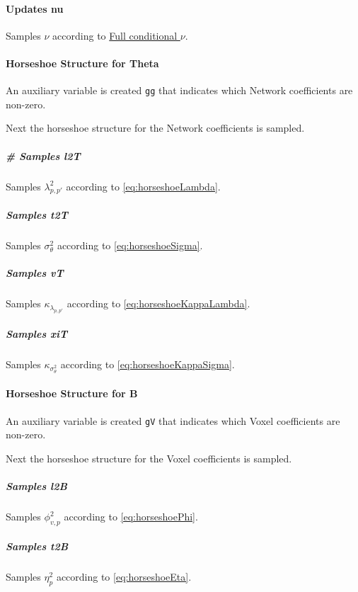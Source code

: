 \documentclass[
]{article}
\begin{document}
\paragraph{Updates nu}\label{updates-nu}

Samples \(\nu\) according to \hyperref[full-conditional-nu]{Full conditional \(\nu\)}.

\paragraph{Horseshoe Structure for Theta}\label{horseshoe-structure-for-theta}

An auxiliary variable is created \texttt{gg} that indicates which Network coefficients
are non-zero.

Next the horseshoe structure for the Network coefficients is sampled.

\subparagraph{\# Samples l2T}\label{samples-l2t}

Samples \(\lambda^2_{p,p'}\) according to \eqref{eq:horseshoeLambda}.

\subparagraph{Samples t2T}\label{samples-t2t}

Samples \(\sigma^2_\theta\) according to \eqref{eq:horseshoeSigma}.

\subparagraph{Samples vT}\label{samples-vt}

Samples \(\kappa_{\lambda_{p,p'}}\) according to \eqref{eq:horseshoeKappaLambda}.

\subparagraph{Samples xiT}\label{samples-xit}

Samples \(\kappa_{\sigma^2_\theta}\) according to \eqref{eq:horseshoeKappaSigma}.

\paragraph{Horseshoe Structure for B}\label{horseshoe-structure-for-b}

An auxiliary variable is created \texttt{gV} that indicates which Voxel coefficients
are non-zero.

Next the horseshoe structure for the Voxel coefficients is sampled.

\subparagraph{Samples l2B}\label{samples-l2b}

Samples \(\phi^2_{v,p}\) according to \eqref{eq:horseshoePhi}.

\subparagraph{Samples t2B}\label{samples-t2b}

Samples \(\eta^2_p\) according to \eqref{eq:horseshoeEta}.
\end{document}
